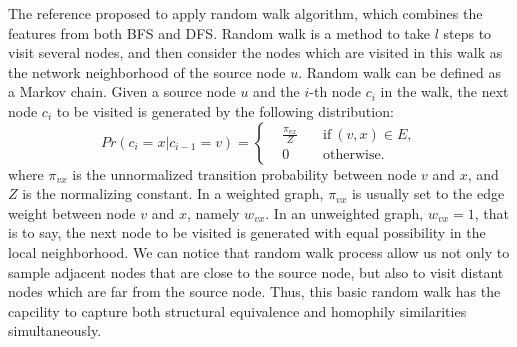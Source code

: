\documentclass[sigconf]{acmart}
\begin{document}
The reference \cite{node2vec} proposed to apply random walk algorithm, which combines the features from both BFS and DFS. Random walk is a method to take $l$ steps to visit several nodes, and then consider the nodes which are visited in this walk as the network neighborhood of the source node $u$. Random walk can be defined as a Markov chain. Given a source node $u$ and the $i$-th node $c_i$ in the walk, the next node $c_i$ to be visited is generated by the following distribution: 
$$Pr(c_i=x|c_{i-1}=v)=\left\{
\begin{aligned}
&\frac{\pi_{vx}}{Z} \quad &\text{if}\ (v,x)\in E, \\
&0 \quad &\text{otherwise.} 
\end{aligned}
\right.$$
where $\pi_{vx}$ is the unnormalized transition probability between node $v$ and $x$, and $Z$ is the normalizing constant. In a weighted graph, $\pi_{vx}$ is usually set to the edge weight between node $v$ and $x$, namely $w_{vx}$. In an unweighted graph, $w_{vx}=1$, that is to say, the next node to be visited is generated with equal possibility in the local neighborhood. We can notice that random walk process allow us not only to sample adjacent nodes that are close to the source node, but also to visit distant nodes which are far from the source node. Thus, this basic random walk has the capcility to capture both structural equivalence and homophily similarities simultaneously. 
\end{document}
